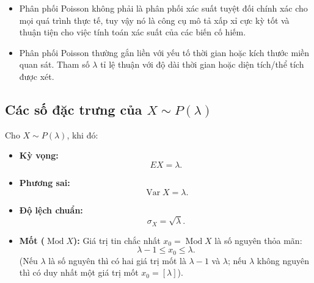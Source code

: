 \begin{nhanxet}
\begin{itemize}
    \item Phân phối Poisson không phải là phân phối xác suất tuyệt đối chính xác cho mọi quá trình thực tế, tuy vậy nó là công cụ mô tả xấp xỉ cực kỳ tốt và thuận tiện cho việc tính toán xác suất của các biến cố hiếm.
    \item Phân phối Poisson thường gắn liền với yếu tố thời gian hoặc kích thước miền quan sát. Tham số $\lambda$ tỉ lệ thuận với độ dài thời gian hoặc diện tích/thể tích được xét.
\end{itemize}
\end{nhanxet}

\subsection{Các số đặc trưng của \texorpdfstring{$X \sim P(\lambda)$}{X ~ P(lambda)}}

\begin{tinhchat}
Cho $X \sim P(\lambda)$, khi đó:
\begin{itemize}
    \item \textbf{Kỳ vọng:}
    \[
    EX = \lambda.
    \]
    \item \textbf{Phương sai:}
    \[
    \operatorname{Var} X = \lambda.
    \]
    \item \textbf{Độ lệch chuẩn:}
    \[
    \sigma_X = \sqrt{\lambda}.
    \]
    \item \textbf{Mốt ($\operatorname{Mod} X$):} Giá trị tin chắc nhất $x_0 = \operatorname{Mod} X$ là số nguyên thỏa mãn:
    \[
    \lambda - 1 \le x_0 \le \lambda.
    \]
    (Nếu $\lambda$ là số nguyên thì có hai giá trị mốt là $\lambda - 1$ và $\lambda$; nếu $\lambda$ không nguyên thì có duy nhất một giá trị mốt $x_0 = [\lambda]$).
\end{itemize}
\end{tinhchat}

